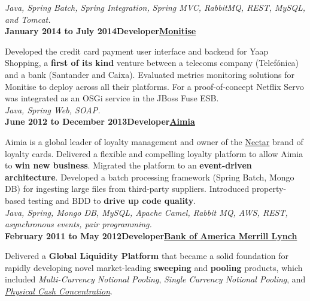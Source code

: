 \documentclass[a4paper,12pt]{article}
\newcommand{\clientwork}[3]{\textbf{#1\hfill#3\hfill#2}\nopagebreak}
\newcommand{\renewals}[1]{}
\newcommand{\techstack}[1]{\textit{#1}}
\begin{document}
\techstack{Java, Spring Batch, Spring Integration, Spring MVC, RabbitMQ, REST, MySQL, and Tomcat.}\\

\clientwork{January 2014 to July 2014}{\href{http://www.monitise.com/}{Monitise}}{Developer}

Developed the credit card payment user interface and backend for Yaap Shopping, a \textbf{first of its kind} venture between a telecoms company (Telef\'onica) and a bank (Santander and Caixa).  Evaluated metrics monitoring solutions for Monitise to deploy across all their platforms. For a proof-of-concept Netflix Servo was integrated as an OSGi service in the JBoss Fuse ESB.\\

\techstack{Java, Spring Web, SOAP.}\\

\clientwork{June 2012 to December 2013}{\href{http://www.aimia.com/}{Aimia}}{Developer}

\renewals{2}

Aimia is a global leader of loyalty management and owner of the \href{http://www.nectar.com/}{Nectar} brand of loyalty cards. Delivered a flexible and compelling loyalty platform to allow Aimia to \textbf{win new business}. Migrated the platform to an \textbf{event-driven architecture}. Developed a batch processing framework (Spring Batch, Mongo DB) for ingesting large files from third-party suppliers. Introduced property-based testing and BDD to \textbf{drive up code quality}.\\

\techstack{Java, Spring, Mongo DB, MySQL, Apache Camel, Rabbit MQ, AWS, REST, asynchronous events, pair programming.}\\

\clientwork{February 2011 to May 2012}{\href{http://corp.bankofamerica.com/}{Bank of America Merrill Lynch}}{Developer}

\renewals{3}


Delivered a \textbf{Global Liquidity Platform} that became a solid foundation for rapidly developing novel market-leading \textbf{sweeping} and \textbf{pooling} products, which included \emph{Multi-Currency Notional Pooling}, \emph{Single Currency Notional Pooling}, and \emph{\href{http://www.marketwatch.com/story/bank-of-america-merrill-lynch-adds-physical-cash-concentration-to-global-liquidity-platform-2012-03-19}{Physical Cash Concentration}}.\\
\end{document}
